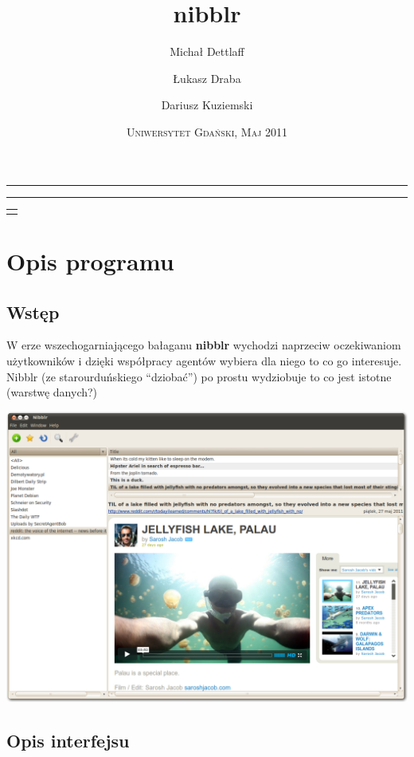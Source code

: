 \documentclass[a4paper,11pt]{report}
\title{nibblr}
\author{Michał Dettlaff \and Łukasz Draba \and Dariusz Kuziemski}
\date{\textsc{Uniwersytet Gdański, Maj 2011}}
\makeatletter
\newcommand{\linia}{\rule{\linewidth}{0.5mm}}
\renewcommand{\maketitle}{\begin{titlepage}
    \vspace*{5cm}
    \noindent\linia
    \begin{center} 
      \LARGE\textsc{\@title}
     \end{center}
     \linia
    \vspace{2cm}
    \begin{flushright}
    \begin{minipage}{5cm}
    \begin{tabular}[t]{l}%
    \@author
    \end{tabular}\par
    \end{minipage}
     \end{flushright}
    \vfill
    \begin{center}
    \@date
    \end{center}
  \end{titlepage}
}
\makeatother
\begin{document}
\maketitle

\section{Opis programu}

\subsection{Wstęp}
W erze wszechogarniającego bałaganu \textbf{nibblr} wychodzi naprzeciw
oczekiwaniom użytkowników i dzięki współpracy agentów wybiera dla niego to co go
interesuje. Nibblr (ze starourduńskiego ``dziobać'') %
po prostu wydziobuje to co jest istotne (warstwę danych?)

\begin{center}
	\includegraphics[scale=0.27]{./img/nibblr0.png}
\end{center}

\newpage
\subsection{Opis interfejsu}

\end{document}
